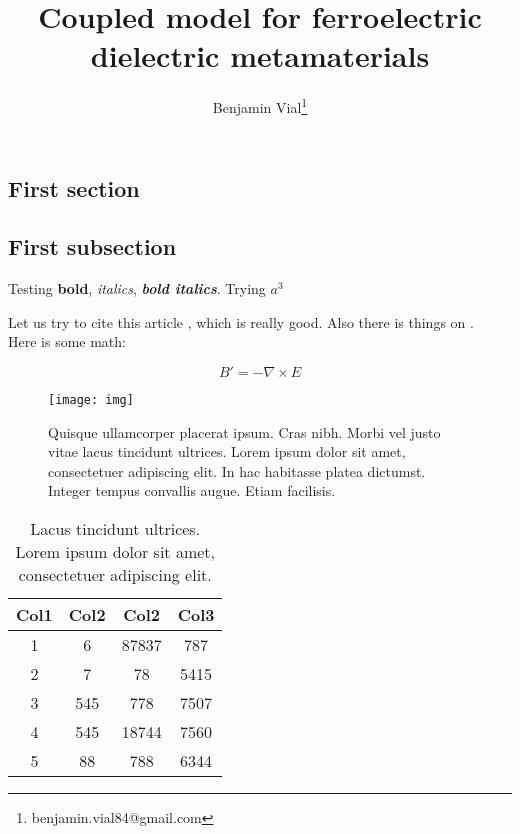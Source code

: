 \documentclass[fontsize=9pt]{scrartcl}
\title{Coupled model for ferroelectric dielectric metamaterials}
\author[1]{ Benjamin Vial\thanks{ benjamin.vial84@gmail.com } }
\affil[1]{School of things, University of stuff, City XXXXX, Country}
\begin{document}
\maketitle

\begin{abstract}
\lipsum[1]
\end{abstract}

\begin{multicols}{2}


\lipsum[2]

\section{First section}


\subsection{First subsection}

Testing \textbf{bold}, \textit{italics}, \textit{\textbf{bold italics}}.
Trying $a^3$

\lipsum
Let us try to cite this article \cite{knuth:ct:a}, which is really good. Also
there is things on . \\
Here is some math:

\begin{equation}
B'=-\nabla \times E
\end{equation}


\begin{figure}[H]
  \texttt{[image: img]}
  \caption{Quisque ullamcorper placerat ipsum. Cras nibh. Morbi
vel justo vitae lacus tincidunt ultrices. Lorem ipsum dolor
 sit amet, consectetuer adipiscing elit. In hac habitasse
platea dictumst. Integer tempus convallis augue. Etiam facilisis.}
  \label{fig:1}
\end{figure}



\begin{table}[H]
\centering
 \begin{tabular}{||c c c c||}
 \hline
 Col1 & Col2 & Col2 & Col3 \\ [0.5ex]
 \hline\hline
 1 & 6 & 87837 & 787 \\
 2 & 7 & 78 & 5415 \\
 3 & 545 & 778 & 7507 \\
 4 & 545 & 18744 & 7560 \\
 5 & 88 & 788 & 6344 \\ [1ex]
 \hline
 \end{tabular}
 \caption{Lacus tincidunt ultrices. Lorem ipsum dolor
  sit amet, consectetuer adipiscing elit.}
\end{table}



\lipsum[2-6]
\vspace*{1em}

\printbibliography[title=References]
%


\end{multicols}
\end{document}
